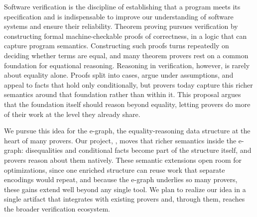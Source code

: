 Software verification is the discipline of establishing that a program meets its
specification and is indispensable to improve our understanding of software 
systems and ensure their reliability. 
Theorem proving pursues verification by constructing formal machine-checkable 
proofs of correctness, in a logic that can capture program semantics.
Constructing such proofs turns repeatedly on deciding whether terms are equal,
and many theorem provers rest on a common foundation for equational reasoning.
Reasoning in verification, however, is rarely about equality alone. 
Proofs split into cases, argue under assumptions, and appeal to facts that hold 
only conditionally, but provers today capture this richer semantics around that 
foundation rather than within it. This proposal argues that the foundation
itself should reason beyond equality, letting provers do more of their work at
the level they already share.

We pursue this idea for the e-graph, the equality-reasoning data structure at 
the heart of many provers. Our project, \system, moves that richer semantics
inside the e-graph: disequalities and conditional facts become part of the
structure itself, and provers reason about them natively. These semantic
extensions open room for optimizations, since one enriched structure can reuse
work that separate encodings would repeat, and because the e-graph underlies so
many provers, these gains extend well beyond any single tool. We plan to realize our
idea in a single artifact that integrates with existing provers and, through
them, reaches the broader verification ecosystem.